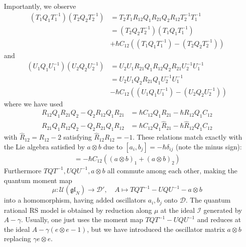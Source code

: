 \documentclass[11pt]{report}
\theoremstyle{definition}
\theoremstyle{remark}
\theoremstyle{remark}
\begin{document}
Importantly, we observe
\begin{align*}
(T_1 Q_1 T_1^{-1}) (T_2 Q_2 T_2^{-1})
&= T_2 T_1 R_{12} Q_1 R_{21} Q_2 R_{12} T_2^{-1} T_1^{-1} \\
&= (T_2 Q_2 T_2^{-1}) (T_1 Q_1 T_1^{-1}) \\
&+ \hbar C_{12} ((T_1 Q_1 T_1^{-1})-(T_2 Q_2 T_2^{-1}))
\end{align*}
and
\begin{align*}
(U_1 Q_1 U_1^{-1}) (U_2 Q_2 U_2^{-1})
&= U_2 U_1 R_{21} Q_1 R_{12} Q_2 R_{21} U_2^{-1} U_1^{-1} \\
&= U_2 U_1 Q_2 R_{21} Q_1 U_2^{-1} U_1^{-1} \\
&- \hbar C_{12} ((U_1 Q_1 U_1^{-1})-(U_2 Q_2 U_2^{-1}))
\end{align*}
where we have used
\begin{align*}
R_{12} Q_1 R_{21} Q_2 - Q_2 R_{12} Q_1 R_{21} &= \hbar C_{12} Q_1 R_{21} - \hbar R_{12} Q_1 C_{12} \\
R_{21} Q_1 R_{12} Q_2 - Q_2 R_{21} Q_1 R_{12} &= \hbar C_{12} Q_1 \hat R_{21} - \hbar \hat R_{12} Q_1 C_{12}
\end{align*}
with $\hat R_{12} = R_{12} - 2$ satisfying $\hat R_{12} R_{12} = -1$. These relations match exactly with the Lie algebra satisfied by $a \otimes b$ due to $[a_i,b_j] = -\hbar \delta_{ij}$ (note the minus sign):
\begin{align*}
[(a \otimes b)_1,(a \otimes b)_2] = -\hbar C_{12} ((a \otimes b)_1 + (a \otimes b)_2)
\end{align*}
Furthermore $TQT^{-1},UQU^{-1},a \otimes b$ all commute among each other, making the quantum moment map
\begin{equation*}
\mu: \mathcal{U}(\mathfrak{gl}_N) \to \mathcal{D}', \quad A \mapsto TQT^{-1} - UQU^{-1} - a \otimes b
\end{equation*}
into a homomorphism, having added oscillators $a_i,b_j$ onto $\mathcal{D}$. The quantum rational RS model is obtained by reduction along $\mu$ at the ideal $\mathcal{I}$ generated by $A-\gamma$. Usually, one just uses the moment map $TQT^{-1}-UQU^{-1}$ and reduces at the ideal $A-\gamma(e \otimes e-1)$, but we have introduced the oscillator matrix $a \otimes b$ replacing $\gamma e \otimes e$.
\end{document}
